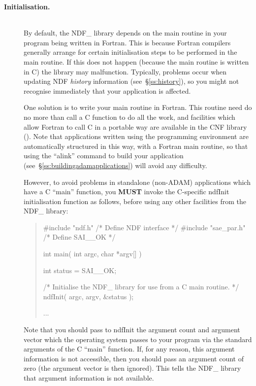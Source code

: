 \documentclass[twoside,11pt,nolof]{starlink}
\providecommand{\st}[1]{{\emph{#1}}}
\begin{document}
\begin{description}
\item[{\bf{Initialisation.}}]\mbox{}\\
By default, the NDF\_ library depends on the main routine in your
program being written in Fortran. This is because Fortran compilers
generally arrange for certain initialisation steps to be performed in
the main routine. If this does not happen (because the main routine is
written in C) the library may malfunction. Typically, problems occur
when updating NDF \st{history\/} information (see~\S\ref{ss:history}),
so you might not recognise immediately that your application is
affected.

One solution is to write your main routine in Fortran. This routine
need do no more than call a C function to do all the work, and
facilities which allow Fortran to call C in a portable way are
available in the CNF library (). Note that
applications written using the  programming
environment are automatically structured in this way, with a Fortran
main routine, so that using the ``alink'' command to build your
application (see~\S\ref{ss:buildingadamapplications}) will avoid any
difficulty.

However, to avoid problems in standalone (non-ADAM) applications which
have a C ``main'' function, you {\bf{MUST}} invoke the C-specific
ndfInit initialisation function as follows, before using any other
facilities from the NDF\_ library:

\small
\begin{quote}
\begin{terminalv}
#include "ndf.h"                 /* Define NDF interface */
#include "sae_par.h"             /* Define SAI__OK */

int main( int argc, char *argv[] ) {
   int status = SAI__OK;

/* Initialise the NDF_ library for use from a C main routine. */
   ndfInit( argc, argv, &status );

   ...

}
\end{terminalv}
\end{quote}
\normalsize

Note that you should pass to ndfInit the argument count and argument
vector which the operating system passes to your program via the
standard arguments of the C ``main'' function. If, for any reason,
this argument information is not accessible, then you should pass an
argument count of zero (the argument vector is then ignored). This
tells the NDF\_ library that argument information is not available.


\end{description}
\end{document}
